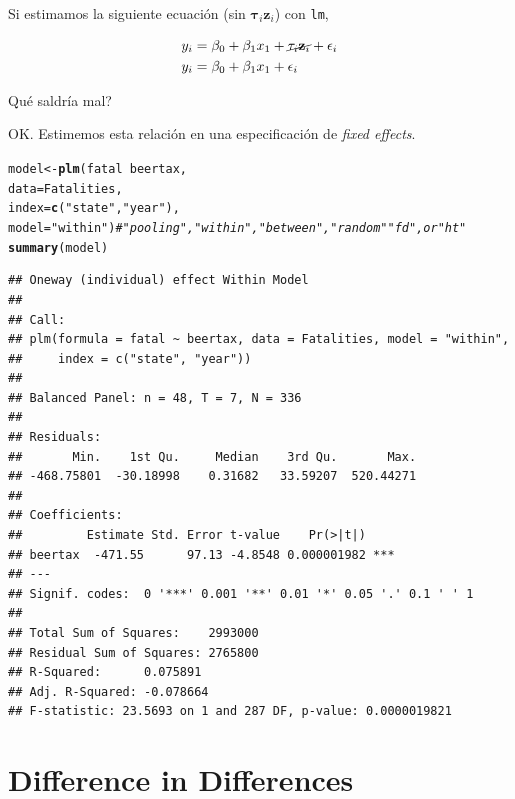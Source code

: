 \documentclass[onesided]{article}\usepackage[]{graphicx}\usepackage[]{color}
\makeatletter
\newcommand{\hlstr}[1]{\textcolor[rgb]{0.192,0.494,0.8}{#1}}%
\newcommand{\hlcom}[1]{\textcolor[rgb]{0.678,0.584,0.686}{\textit{#1}}}%
\newcommand{\hlopt}[1]{\textcolor[rgb]{0,0,0}{#1}}%
\newcommand{\hlstd}[1]{\textcolor[rgb]{0.345,0.345,0.345}{#1}}%
\newcommand{\hlkwb}[1]{\textcolor[rgb]{0.69,0.353,0.396}{#1}}%
\newcommand{\hlkwc}[1]{\textcolor[rgb]{0.333,0.667,0.333}{#1}}%
\newcommand{\hlkwd}[1]{\textcolor[rgb]{0.737,0.353,0.396}{\textbf{#1}}}%
\newenvironment{kframe}{%
 \def\at@end@of@kframe{}%
 \ifinner\ifhmode%
  \def\at@end@of@kframe{\end{minipage}}%
  \begin{minipage}{\columnwidth}%
 \fi\fi%
 \def\FrameCommand##1{\hskip\@totalleftmargin \hskip-\fboxsep
 \colorbox{shadecolor}{##1}\hskip-\fboxsep
     \hskip-\linewidth \hskip-\@totalleftmargin \hskip\columnwidth}%
 \MakeFramed {\advance\hsize-\width
   \@totalleftmargin\z@ \linewidth\hsize
   \@setminipage}}%
 {\par\unskip\endMakeFramed%
 \at@end@of@kframe}
\newenvironment{knitrout}{}{} %
\makeatother
\begin{document}
Si estimamos la siguiente ecuaci\'on (sin ${\mathbf \tau}_{i}{\mathbf z}_{i}$) con \texttt{lm},

\begin{equation}\label{lm}
\begin{split}
y_{i} & = \beta_{0} + {\mathbf \beta_{1}x_{1}} + \cancel{{\mathbf \tau}_{i}{\mathbf z}_{i}} + \epsilon_{i}\\
y_{i} & = \beta_{0} + {\mathbf \beta_{1}x_{1}}  + \epsilon_{i}
\end{split}
\end{equation}

{\color{red}Qu\'e saldr\'ia mal?}


OK. Estimemos esta relaci\'on en una especificaci\'on de \emph{fixed effects}.

\begin{knitrout}
\color{fgcolor}\begin{kframe}
\begin{alltt}
\hlstd{model} \hlkwb{<-} \hlkwd{plm}\hlstd{(fatal} \hlopt{~} \hlstd{beertax,}
                    \hlkwc{data} \hlstd{= Fatalities,}
                    \hlkwc{index} \hlstd{=} \hlkwd{c}\hlstd{(}\hlstr{"state"}\hlstd{,} \hlstr{"year"}\hlstd{),}
                    \hlkwc{model} \hlstd{=} \hlstr{"within"}\hlstd{)} \hlcom{# "pooling", "within", "between", "random" "fd", or "ht"}
\hlkwd{summary}\hlstd{(model)}
\end{alltt}
\begin{verbatim}
## Oneway (individual) effect Within Model
## 
## Call:
## plm(formula = fatal ~ beertax, data = Fatalities, model = "within", 
##     index = c("state", "year"))
## 
## Balanced Panel: n = 48, T = 7, N = 336
## 
## Residuals:
##       Min.    1st Qu.     Median    3rd Qu.       Max. 
## -468.75801  -30.18998    0.31682   33.59207  520.44271 
## 
## Coefficients:
##         Estimate Std. Error t-value    Pr(>|t|)    
## beertax  -471.55      97.13 -4.8548 0.000001982 ***
## ---
## Signif. codes:  0 '***' 0.001 '**' 0.01 '*' 0.05 '.' 0.1 ' ' 1
## 
## Total Sum of Squares:    2993000
## Residual Sum of Squares: 2765800
## R-Squared:      0.075891
## Adj. R-Squared: -0.078664
## F-statistic: 23.5693 on 1 and 287 DF, p-value: 0.0000019821
\end{verbatim}
\end{kframe}
\end{knitrout}



\section{Difference in Differences}
\end{document}
